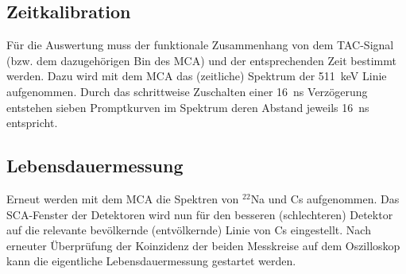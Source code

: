\subsection{Zeitkalibration}
Für die Auswertung muss der funktionale Zusammenhang von dem TAC-Signal (bzw. dem dazugehörigen Bin des MCA) und der entsprechenden Zeit bestimmt werden. Dazu wird mit dem MCA das (zeitliche) Spektrum der \SI{511}{\kilo\electronvolt} Linie aufgenommen. Durch das schrittweise Zuschalten einer \SI{16}{\nano\second} Verzögerung entstehen sieben Promptkurven im Spektrum deren Abstand jeweils \SI{16}{\nano\second} entspricht. 

\subsection{Lebensdauermessung}
Erneut werden mit dem MCA die Spektren von $^{22}$Na und Cs aufgenommen. Das SCA-Fenster der Detektoren wird nun für den besseren (schlechteren) Detektor auf die relevante bevölkernde (entvölkernde) Linie von Cs eingestellt. Nach erneuter Überprüfung der Koinzidenz der beiden Messkreise auf dem Oszilloskop kann die eigentliche Lebensdauermessung gestartet werden. 
